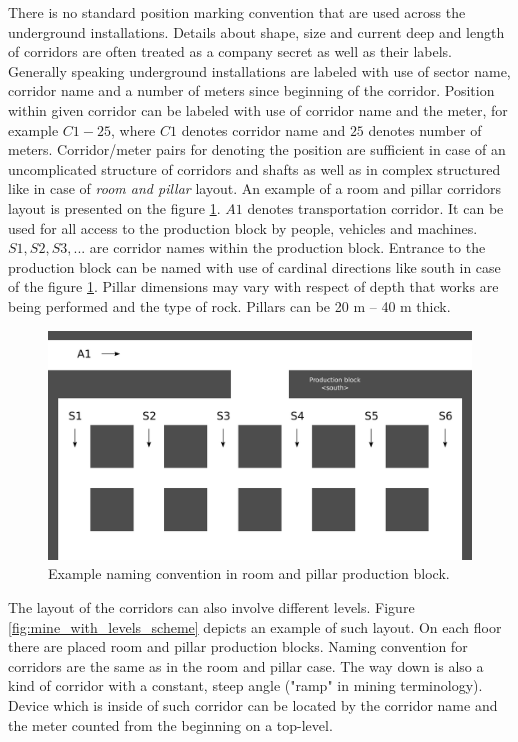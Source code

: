 \documentclass[../main.tex]{subfiles}
\begin{document}
There is no standard position marking convention that are used across the underground installations. Details about shape, size and current deep and length of corridors are often treated as a company secret as well as their labels. Generally speaking underground installations are labeled with use of sector name, corridor name and a number of meters since beginning of the corridor. Position within given corridor can be labeled with use of corridor name and the meter, for example $C1-25$, where $C1$ denotes corridor name and $25$ denotes number of meters. Corridor/meter pairs for denoting the position are sufficient in case of an uncomplicated structure of corridors and shafts as well as in complex structured like in case of \textit{room and pillar} layout. An example of a room and pillar corridors layout is presented on the figure \ref{fig:room_and_pillar_scheme}. $A1$ denotes transportation corridor. It can be used for all access to the production block by people, vehicles and machines. $S1, S2, S3, ...$ are corridor names within the production block. Entrance to the production block can be named with use of cardinal directions like south in case of the figure \ref{fig:room_and_pillar_scheme}. Pillar dimensions may vary with respect of depth that works are being performed and the type of rock. Pillars can be 20 m -- 40 m thick.

\begin{figure}[ht]
\includegraphics[width=\textwidth]{pictures/room_and_pillar_scheme.pdf}
\centering
\caption{Example naming convention in room and pillar production block.}
\label{fig:room_and_pillar_scheme}
\end{figure}

The layout of the corridors can also involve different levels. Figure \ref{fig:mine_with_levels_scheme} depicts an example of such layout. On each floor there are placed room and pillar production blocks. Naming convention for corridors are the same as in the room and pillar case. The way down is also a kind of corridor with a constant, steep angle ("ramp" in mining terminology). Device which is inside of such corridor can be located by the corridor name and the meter counted from the beginning on a top-level.
\end{document}
